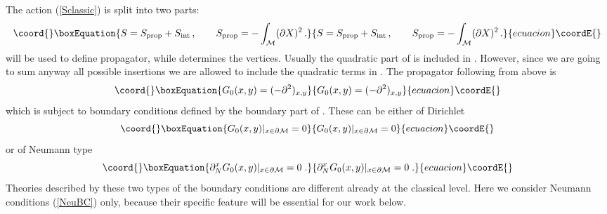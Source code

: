 \documentclass[a4paper,12pt]{article}
\begin{document}
The action (\ref{Sclassic}) is split into two parts:
\begin{equation}\coord{}\boxEquation{
S=S_{{\mbox {\scriptsize {prop}}}}+S_{{\mbox {\scriptsize {int}}}}
\,,\qquad S_{{\mbox {\scriptsize {prop}}}}=
-\int_{\cal M} (\partial X)^2 \,.
\label{Ssplit}
}{
S=S_{{\mbox {\scriptsize {prop}}}}+S_{{\mbox {\scriptsize {int}}}}
\,,\qquad S_{{\mbox {\scriptsize {prop}}}}=
-\int_{\cal M} (\partial X)^2 \,.
}{ecuacion}\coordE{}\end{equation}
\coordHE{} will be used to define propagator,
while \coordHE{} determines the vertices.
Usually the quadratic part of \coordHE{} is included in 
\coordHE{}. However, since we are going
to sum anyway all possible insertions we are allowed to include
the quadratic terms in \coordHE{}.
The propagator following from \coordHE{}
above is 
\begin{equation}\coord{}\boxEquation{
G_0(x,y)=(-\partial^2)_{x,y} \label{G0}
}{
G_0(x,y)=(-\partial^2)_{x,y} }{ecuacion}\coordE{}\end{equation}
which is subject to boundary conditions defined by the
boundary part of \coordHE{}.
These can be either of  Dirichlet 
\begin{equation}\coord{}\boxEquation{
G_0(x,y)|_{x\in {\partial {\cal M}}}=0 \label{DirBC}
}{
G_0(x,y)|_{x\in {\partial {\cal M}}}=0 }{ecuacion}\coordE{}\end{equation}
or of Neumann type 
\begin{equation}\coord{}\boxEquation{
\partial_N^xG_0(x,y)|_{x\in {\partial {\cal M}}}=0\; . \label{NeuBC}
}{
\partial_N^xG_0(x,y)|_{x\in {\partial {\cal M}}}=0\; . }{ecuacion}\coordE{}\end{equation}
Theories described by these two types
of the boundary conditions are different already at the
classical level. Here we consider Neumann conditions (\ref{NeuBC})
only, because their specific feature will be essential for 
our work below. 
\end{document}

